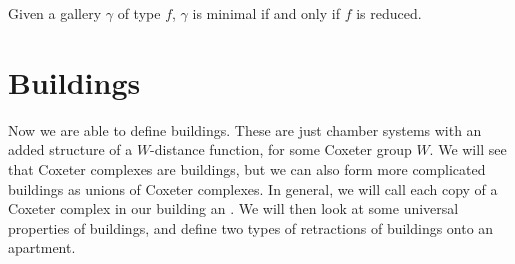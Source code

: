 \documentclass[11pt]{article}
\begin{document}

\begin{theorem}
    Given a gallery $\gamma$ of type $f$, $\gamma$ is minimal if and only if $f$ is reduced.
\end{theorem}







\section{Buildings}\label{4}

Now we are able to define buildings. These are just chamber systems with an added structure of a $W$-distance function, for some Coxeter group $W$. We will see that Coxeter complexes are buildings, but we can also form more complicated buildings as unions of Coxeter complexes. In general, we will call each copy of a Coxeter complex in our building an . We will then look at some universal properties of buildings, and define two types of retractions of buildings onto an apartment. 
\end{document}
